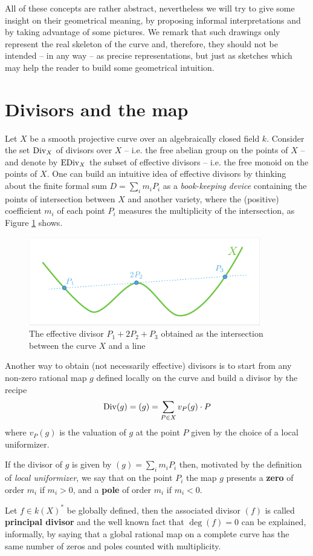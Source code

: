 All of these concepts are rather abstract, nevertheless we will try to give some insight on their geometrical meaning, by proposing informal interpretations and by taking advantage of some pictures.
We remark that such drawings only represent the real skeleton of the curve and, therefore, they should not be intended -- in any way -- as precise representations, but just as sketches which may help the reader to build some geometrical intuition.

\section{Divisors and the \AJJ map}

	Let $X$ be a smooth projective curve over an algebraically closed field $k$. Consider the set $\operatorname{Div}_X$ of divisors over $X$ -- i.e. the free abelian group on the points of $X$ -- and denote by $\operatorname{EDiv}_X$ the subset of effective divisors -- i.e. the free monoid on the points of $X$. One can build an intuitive idea of effective divisors by thinking about the finite formal sum $D=\sum_i m_i P_i$ as a \emph{book-keeping device} containing the points of intersection between $X$ and another variety, where the (positive) coefficient $m_i$ of each point $P_i$ measures the multiplicity of the intersection, as Figure \ref{fig:Divisors} shows.

	\begin{figure}[h]
			\centering
			\includegraphics[width=0.9\textwidth]{Divisors.pdf}
			\caption{The effective divisor $P_1 + 2P_2 + P_3$ obtained as the intersection between the curve $X$ and a line}
			\label{fig:Divisors}
	\end{figure}

	Another way to obtain (not necessarily effective) divisors is to start from any non-zero rational map $g$ defined locally on the curve and build a divisor by the recipe
	$$ \operatorname{Div}(g) = (g) = \sum_{P\in X} v_P(g) \cdot P $$
	where $v_P(g)$ is the valuation of $g$ at the point $P$ given by the choice of a local uniformizer. 
	\begin{rema}
		If the divisor of $g$ is given by $(g)=\sum_i m_i P_i$ then, motivated by the definition of \emph{local uniformizer}, we say that on the point $P_i$ the map $g$ presents a \textbf{zero} of order $m_i$ if $m_i>0$, and a \textbf{pole} of order $m_i$ if $m_i<0$.
	\end{rema}	
	Let $f\in k(X)^*$ be globally defined, then the associated divisor $(f)$ is called \textbf{principal divisor} and the well known fact that $\deg(f)=0$ can be explained, informally, by saying that a global rational map on a complete curve has the same number of zeros and poles counted with multiplicity.\\

